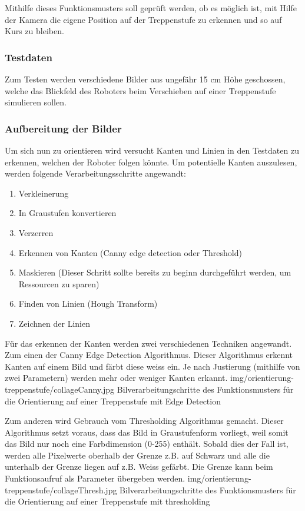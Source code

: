 Mithilfe dieses Funktionsmusters soll geprüft werden, ob es möglich ist, mit Hilfe der Kamera die eigene Position auf der Treppenstufe zu erkennen und so auf Kurs zu bleiben. 

\subsubsection{Testdaten}
Zum Testen werden verschiedene Bilder aus ungefähr 15 cm Höhe geschossen, welche das Blickfeld des Roboters beim Verschieben auf einer Treppenstufe simulieren sollen.

\subsubsection{Aufbereitung der Bilder}
\label{aufbereitungDerBilder}
Um sich nun zu orientieren wird versucht Kanten und Linien in den Testdaten zu erkennen, welchen der Roboter folgen könnte. Um potentielle Kanten auszulesen, werden folgende Verarbeitungsschritte angewandt:
\begin{enumerate}
    \item Verkleinerung
    \item In Graustufen konvertieren
    \item Verzerren
    \item Erkennen von Kanten (Canny edge detection oder Threshold)
    \item Maskieren (Dieser Schritt sollte bereits zu beginn durchgeführt werden, um Ressourcen zu sparen)
    \item Finden von Linien (Hough Transform)
    \item Zeichnen der Linien
\end{enumerate}
Für das erkennen der Kanten werden zwei verschiedenen Techniken angewandt. Zum einen der Canny Edge Detection Algorithmus\cite{OpenCV-Canny}. Dieser Algorithmus erkennt Kanten auf einem Bild und färbt diese weiss ein. Je nach Justierung (mithilfe von zwei Parametern) werden mehr oder weniger Kanten erkannt.
\image
  {img/orientierung-treppenstufe/collageCanny.jpg}
  {Bilverarbeitungschritte des Funktionsmusters für die Orientierung auf einer Treppenstufe mit Edge Detection}
  
Zum anderen wird Gebrauch vom Thresholding Algorithmus\cite{OpenCV-Threshold} gemacht. Dieser Algorithmus setzt voraus, dass das Bild in Graustufenform vorliegt, weil somit das Bild nur noch eine Farbdimension (0-255) enthält. Sobald dies der Fall ist, werden alle Pixelwerte oberhalb der Grenze z.B. auf Schwarz und alle die unterhalb der Grenze liegen auf z.B. Weiss gefärbt. Die Grenze kann beim Funktionsaufruf als Parameter übergeben werden.
\image
  {img/orientierung-treppenstufe/collageThresh.jpg}
  {Bilverarbeitungschritte des Funktionsmusters für die Orientierung auf einer Treppenstufe mit thresholding}
  
